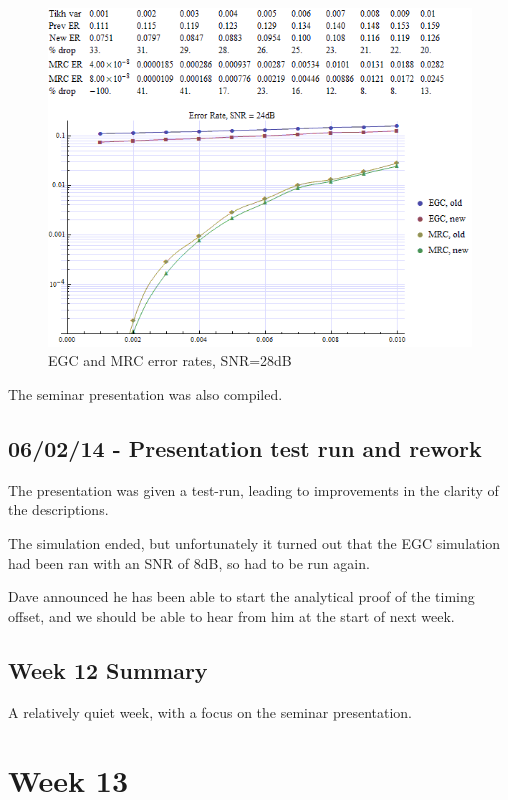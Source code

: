 \begin{figure}[htbp]
\centering
\includegraphics[width=\linewidth]{../../../plots/egc_mrc_28db.png}
\caption{EGC and MRC error rates, SNR=28dB}
\end{figure}

The seminar presentation was also compiled.

\subsection{06/02/14 - Presentation test run and rework}

The presentation was given a test-run, leading to improvements in the
clarity of the descriptions.

The simulation ended, but unfortunately it turned out that the EGC
simulation had been ran with an SNR of 8dB, so had to be run again.

Dave announced he has been able to start the analytical proof of the
timing offset, and we should be able to hear from him at the start of
next week.

\subsection{Week 12 Summary}

A relatively quiet week, with a focus on the seminar presentation.

\section{Week 13}

